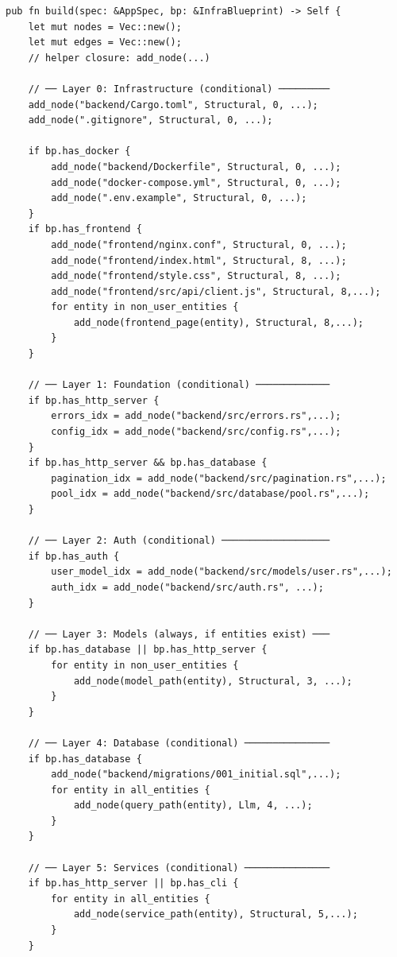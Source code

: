 \documentclass[11pt,a4paper]{article}
\begin{document}
\begin{lstlisting}[style=rust]
pub fn build(spec: &AppSpec, bp: &InfraBlueprint) -> Self {
    let mut nodes = Vec::new();
    let mut edges = Vec::new();
    // helper closure: add_node(...)
    
    // ── Layer 0: Infrastructure (conditional) ─────────
    add_node("backend/Cargo.toml", Structural, 0, ...);
    add_node(".gitignore", Structural, 0, ...);
    
    if bp.has_docker {
        add_node("backend/Dockerfile", Structural, 0, ...);
        add_node("docker-compose.yml", Structural, 0, ...);
        add_node(".env.example", Structural, 0, ...);
    }
    if bp.has_frontend {
        add_node("frontend/nginx.conf", Structural, 0, ...);
        add_node("frontend/index.html", Structural, 8, ...);
        add_node("frontend/style.css", Structural, 8, ...);
        add_node("frontend/src/api/client.js", Structural, 8,...);
        for entity in non_user_entities {
            add_node(frontend_page(entity), Structural, 8,...);
        }
    }
    
    // ── Layer 1: Foundation (conditional) ─────────────
    if bp.has_http_server {
        errors_idx = add_node("backend/src/errors.rs",...);
        config_idx = add_node("backend/src/config.rs",...);
    }
    if bp.has_http_server && bp.has_database {
        pagination_idx = add_node("backend/src/pagination.rs",...);
        pool_idx = add_node("backend/src/database/pool.rs",...);
    }
    
    // ── Layer 2: Auth (conditional) ───────────────────
    if bp.has_auth {
        user_model_idx = add_node("backend/src/models/user.rs",...);
        auth_idx = add_node("backend/src/auth.rs", ...);
    }
    
    // ── Layer 3: Models (always, if entities exist) ───
    if bp.has_database || bp.has_http_server {
        for entity in non_user_entities {
            add_node(model_path(entity), Structural, 3, ...);
        }
    }
    
    // ── Layer 4: Database (conditional) ───────────────
    if bp.has_database {
        add_node("backend/migrations/001_initial.sql",...);
        for entity in all_entities {
            add_node(query_path(entity), Llm, 4, ...);
        }
    }
    
    // ── Layer 5: Services (conditional) ───────────────
    if bp.has_http_server || bp.has_cli {
        for entity in all_entities {
            add_node(service_path(entity), Structural, 5,...);
        }
    }
    

\end{lstlisting}
\end{document}
